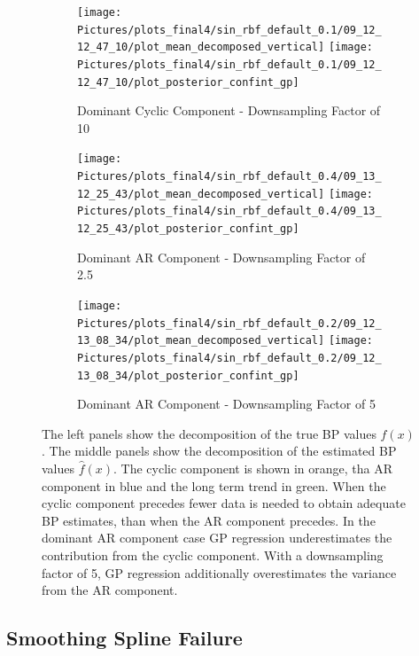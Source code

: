 \begin{figure}

\begin{subfigure}{\textwidth}
    \centering
    \texttt{[image: 
        Pictures/plots\_final4/sin\_rbf\_default\_0.1/09\_12\_12\_47\_10/plot\_mean\_decomposed\_vertical]}
    \texttt{[image: 
        Pictures/plots\_final4/sin\_rbf\_default\_0.1/09\_12\_12\_47\_10/plot\_posterior\_confint\_gp]}
  \caption{Dominant Cyclic Component - Downsampling Factor of 10}
\end{subfigure}

\begin{subfigure}{\textwidth}
    \centering
    \texttt{[image: 
        Pictures/plots\_final4/sin\_rbf\_default\_0.4/09\_13\_12\_25\_43/plot\_mean\_decomposed\_vertical]}
    \texttt{[image: 
        Pictures/plots\_final4/sin\_rbf\_default\_0.4/09\_13\_12\_25\_43/plot\_posterior\_confint\_gp]}
  \caption{Dominant AR Component - Downsampling Factor of 2.5}
    \label{subfig:mean-decomposed-ar-low-downsampling}
\end{subfigure}\hfill

\begin{subfigure}{\textwidth}
    \centering
    \texttt{[image: 
        Pictures/plots\_final4/sin\_rbf\_default\_0.2/09\_12\_13\_08\_34/plot\_mean\_decomposed\_vertical]}
    \texttt{[image: 
        Pictures/plots\_final4/sin\_rbf\_default\_0.2/09\_12\_13\_08\_34/plot\_posterior\_confint\_gp]}
  \caption{Dominant AR Component - Downsampling Factor of 5}
    \label{subfig:mean-decomposed-ar}
\end{subfigure}\hfill
\label{fig:mean-decomposed-ar-cyclic}
\caption[Dominant Cyclic Component vs. Dominant AR Component - Decompostion of $f(x)$]{
    The left panels show the decomposition of the true BP values $f(x)$.
    The middle panels show the decomposition of the estimated BP values $\hat{f}(x)$.
    The cyclic component is shown in orange,
    tha AR component in blue and the long term trend in green.
    When the cyclic component precedes fewer data is needed to obtain adequate BP estimates,
    than when the AR component precedes.
    In the dominant AR component case GP regression underestimates
    the contribution from the cyclic component.
    With a downsampling factor of 5, GP regression additionally overestimates the
    variance from the AR component.
}
\end{figure}

\subsection{Smoothing Spline Failure}

